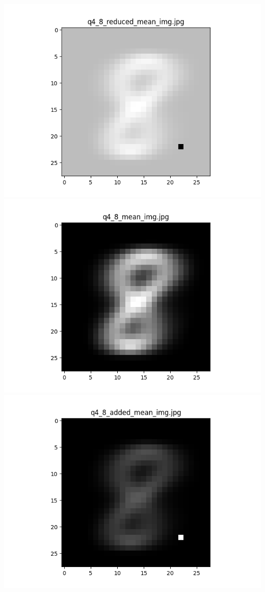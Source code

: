 \documentclass{article}
\begin{document}
    \\
    \includegraphics[scale=.37]{../results/q4/reduced_mean_images/q4_8_reduced_mean_img.png}
    \includegraphics[scale=.37]{../results/q4/mean_images/q4_8_mean_img.png}
    \includegraphics[scale=.37]{../results/q4/added_mean_images/q4_8_added_mean_img.png}
\end{document}
